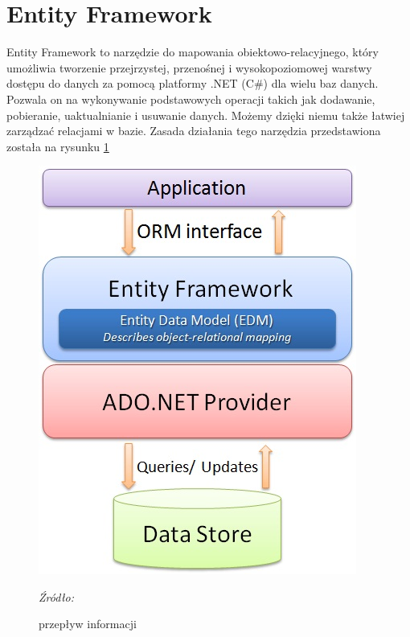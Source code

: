 \documentclass[12pt,oneside]{report}
\begin{document}
\section{Entity Framework}
Entity Framework to narzędzie do mapowania obiektowo-relacyjnego, który umożliwia tworzenie przejrzystej, przenośnej i wysokopoziomowej warstwy dostępu do danych za pomocą platformy .NET (C\#) dla wielu baz danych.  Pozwala on na wykonywanie podstawowych operacji takich jak dodawanie, pobieranie, uaktualnianie i usuwanie danych. Możemy dzięki niemu także łatwiej zarządzać relacjami w bazie. Zasada działania tego narzędzia przedstawiona została na rysunku \ref{EntityArchitecture}
\begin{figure}[H]
	\centering
	\includegraphics[scale=0.5]{EntityArchitecture}
	\caption{przepływ informacji}
	\textit{Źródło: \cite{Entity}}
	\label{EntityArchitecture}
\end{figure}
\end{document}
